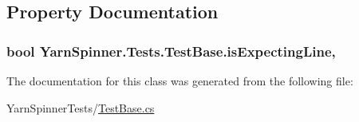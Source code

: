 \subsection{Property Documentation}
\hypertarget{a00146_a47f35b8e8123ed9471883d02b8bc9f3e}{
\subsubsection[{is\-Expecting\-Line}]{\setlength{\rightskip}{0pt plus 5cm}bool Yarn\-Spinner.\-Tests.\-Test\-Base.\-is\-Expecting\-Line\hspace{0.3cm}{\ttfamily [get]}, {\ttfamily [protected]}}}\label{a00146_a47f35b8e8123ed9471883d02b8bc9f3e}


The documentation for this class was generated from the following file\-:\begin{DoxyCompactItemize}
\item 
Yarn\-Spinner\-Tests/\hyperlink{a00282}{Test\-Base.\-cs}\end{DoxyCompactItemize}
